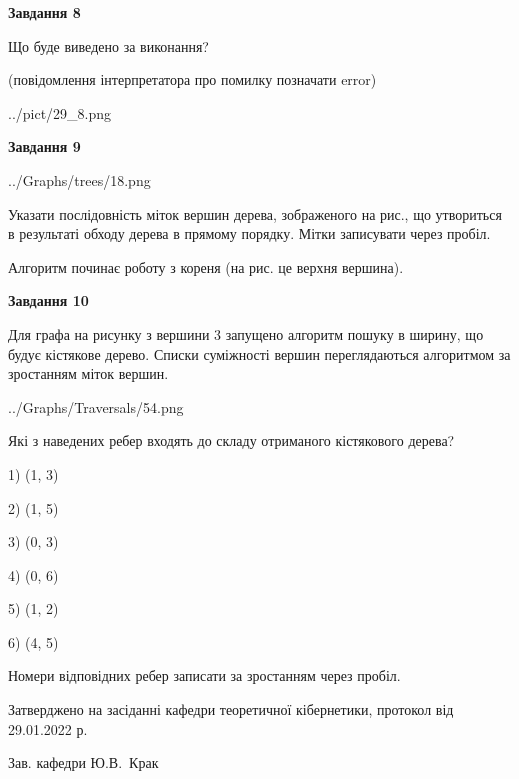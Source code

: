 \documentclass[12pt, ukrainian]{article}
\begin{document}
{\begin {large}
{\begin {center}\textbf{Завдання 8}\end {center}}\par
Що буде виведено за виконання?\par
 (повідомлення інтерпретатора про помилку позначати error)\par
\begin{center}
	{../pict/29_8.png}
\end{center}
\newpage

{\begin {center}\textbf{Завдання 9}\end {center}}\par

\begin{center}
	{../Graphs/trees/18.png}
\end{center}
Указати послідовність міток вершин дерева, зображеного на рис., що утвориться в результаті обходу дерева в прямому порядку. Мітки записувати через пробіл.\par Алгоритм починає роботу з кореня (на рис. це верхня вершина).\par
\newpage

{\begin {center}\textbf{Завдання 10}\end {center}}\par
Для графа на рисунку з вершини 3 запущено алгоритм пошуку в ширину, що будує кістякове дерево. Списки суміжності вершин переглядаються алгоритмом за зростанням міток вершин.\par
\begin{center}
	{../Graphs/Traversals/54.png}
\end{center}
\par Які з наведених ребер входять до складу отриманого кістякового дерева?\par
1) (1, 3)\par
2) (1, 5)\par
3) (0, 3)\par
4) (0, 6)\par
5) (1, 2)\par
6) (4, 5)\par
{\vskip 15pt} Номери відповідних ребер записати за зростанням через пробіл.\par
\newpage


\end {large}
}
{\smallskip \begin {small} Затверджено на засіданні кафедри теоретичної кібернетики, протокол  від   29.01.2022 р.\par\smallskip\smallskip
{\parbox {6.5 cm}{Зав. кафедри \dotfill Ю.В.~Крак}} \end{small}}
\end{document}
